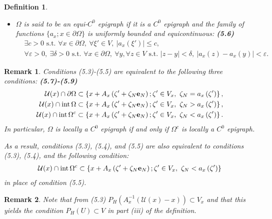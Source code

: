 \documentclass{book}
\numberwithin{equation}{section}
\newtheorem{definition}{Definition}[section]
\newtheorem{remark}{Remark}[section]
\begin{document}
\begin{enumerate}
\begin{definition}
\begin{itemize}
            \item[(iii)] $\Omega$ is said to be \emph{an equi-$C^0$ epigraph} if it is a $C^0$ epigraph and the family of functions $\{a_x;x\in\partial\Omega\}$ is uniformly bounded and equicontinuous: \textbf{(5.6)}
            \begin{align*}
                &\exists c > 0 \mbox{ s.t. } \forall x\in\partial\Omega,\ \forall\xi'\in V,\ \left|a_x\left(\xi'\right)\right|\le c,\\
                &\forall\varepsilon > 0,\ \exists\delta > 0 \mbox{ s.t. } \forall x\in\partial\Omega,\ \forall y,\forall z\in V \mbox{ s.t. } \left|z - y\right| < \delta,\ \left|a_x(z) - a_x(y)\right| < \varepsilon.
            \end{align*}
        \end{itemize}
    \end{definition}
    
    \begin{remark}
        Conditions (5.3)-(5.5) are equivalent to the following three conditions: \textbf{(5.7)-(5.9)}
        \begin{align*}
            \mathcal{U}(x)\cap\partial\Omega&\subset\left\{x + A_x\left(\zeta' + \zeta_N{\bf e}_N\right);\zeta'\in V_x,\ \zeta_N = a_x\left(\zeta'\right)\right\},\\
            \mathcal{U}(x)\cap\operatorname{int}\Omega&\subset\left\{x + A_x\left(\zeta' + \zeta_N{\bf e}_N\right);\zeta'\in V_x,\ \zeta_N > a_x\left(\zeta'\right)\right\},\\
            \mathcal{U}(x)\cap\operatorname{int}\Omega^c&\subset\left\{x + A_x\left(\zeta' + \zeta_N{\bf e}_N\right);\zeta'\in V_x,\ \zeta_N < a_x\left(\zeta'\right)\right\}.
        \end{align*}
        In particular, $\Omega$ is locally a $C^0$ epigraph if and only if $\Omega^c$ is locally a $C^0$ epigraph.
        
        As a result, conditions (5.3), (5.4), and (5.5) are also equivalent to conditions (5.3),
        (5.4), and the following condition:
        \begin{align*}
            \mathcal{U}(x)\cap\operatorname{int}\Omega^c\subset\left\{x + A_x\left(\zeta' + \zeta_N{\bf e}_N\right);\zeta'\in V_x,\ \zeta_N < a_x\left(\zeta'\right)\right\}
        \end{align*}
        in place of condition (5.5).
    \end{remark}

    \begin{remark}
        Note that from (5.3) $P_H(A_x^{-1}(\mathcal{U}(x) - x))\subset V_x$ and that this yields the condition $P_H(U)\subset V$ in part (iii) of the definition.
    \end{remark}
    

\end{enumerate}
\end{document}
